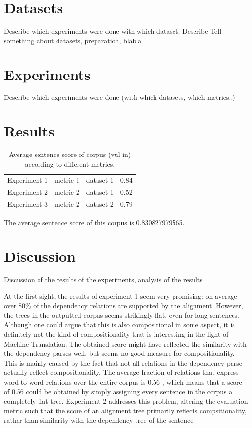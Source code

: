 \documentclass{report}
\theoremstyle{indented}
\begin{document}
\section{Datasets}

Describe which experiments were done with which dataset. Describe
Tell something about datasets, preparation, blabla

\section{Experiments}

Describe which experiments were done (with which datasets, which metrics..)

\section{Results}

\begin{table}\label{table:scores}
\begin{tabular}{llll}
Experiment 1 & metric 1 & dataset 1 & 0.84\\
Experiment 2 & metric 2 & dataset 1 & 0.52\\
Experiment 3 & metric 2 & dataset 2 & 0.79\\
\end{tabular}
\caption{Average sentence score of corpus (vul in) according to different metrics.}
\end{table}


The average sentence score of this corpus is 0.830827979565.

\section{Discussion}

Discussion of the results of the experiments, analysis of the results

At the first sight, the results of experiment 1 seem very promising: on average over 80\% of the dependency relations are supported by the alignment. However, the trees in the outputted corpus seems strikingly flat, even for long sentences. Although one could argue that this is also compositional in some aspect, it is definitely not the kind of compositionality that is interesting in the light of Machine Translation. The obtained score might have reflected the similarity with the dependency parses well, but seems no good measure for compositionality. This is mainly caused by the fact that not all relations in the dependency parse actually reflect compositionality. The average fraction of relations that express word to word relations over the entire corpus is 0.56 %
, which means that a score of 0.56 could be obtained by simply assigning every sentence in the corpus a completely flat tree. Experiment 2 addresses this problem, altering the evaluation metric such that the score of an alignment tree primarily reflects compsitionality, rather than similarity with the dependency tree of the sentence.
\end{document}
